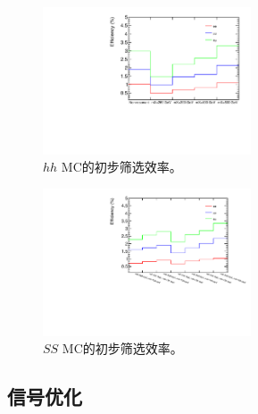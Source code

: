 \begin{figure}
\centering
\includegraphics[width=0.55\textwidth, angle =-90]{fig/SigTopo/eff_presel_hh.pdf}
\caption{$hh$ MC的初步筛选效率。}
\label{fig:eff_pre_sel_hh}
\end{figure}

\begin{figure}
\centering
\includegraphics[width=0.55\textwidth, angle =-90]{fig/SigTopo/eff_presel_SS.pdf}
\caption{$SS$ MC的初步筛选效率。}
\label{fig:eff_pre_sel_SS}
\end{figure}

\subsection{信号优化}

